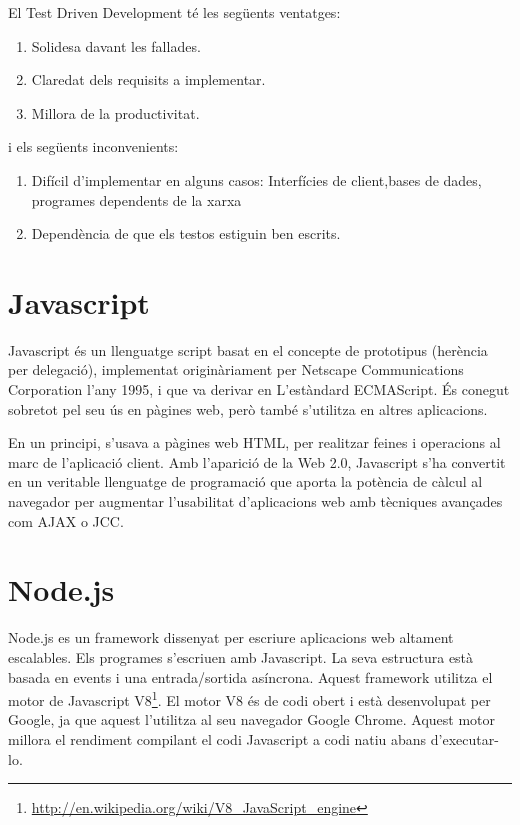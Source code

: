 El Test Driven Development té les següents ventatges: 

\begin{enumerate}
    \item{Solidesa davant les fallades.}
    \item{Claredat dels requisits a implementar.}
    \item{Millora de la productivitat.}
\end{enumerate}

i els següents inconvenients: 

\begin{enumerate}
    \item{Difícil d'implementar en alguns casos: Interfícies de client,bases de dades, programes dependents de la xarxa }
    \item{Dependència de que els testos estiguin ben escrits. }
    
\end{enumerate}



\section{Javascript}

Javascript és un llenguatge script basat en el concepte de prototipus (herència per delegació), implementat originàriament per Netscape Communications Corporation l'any 1995, i que va derivar en L'estàndard ECMAScript. És conegut sobretot pel seu ús en pàgines web, però també s'utilitza en altres aplicacions.

En un principi, s'usava a pàgines web HTML, per realitzar feines i operacions al marc de l'aplicació client. Amb l'aparició de la Web 2.0, Javascript s'ha convertit en un veritable llenguatge de programació que aporta la potència de càlcul al navegador per augmentar l'usabilitat d'aplicacions web amb tècniques avançades com AJAX o JCC.


\section{Node.js}

Node.js es un framework dissenyat per escriure aplicacions web altament escalables. Els programes s'escriuen amb Javascript. La seva estructura està basada en events i una entrada/sortida asíncrona. Aquest framework utilitza el motor de Javascript V8\footnote{\url{http://en.wikipedia.org/wiki/V8_JavaScript_engine}}. El motor V8 és de codi obert i està desenvolupat per Google, ja que aquest l'utilitza al seu navegador Google Chrome. Aquest motor millora el rendiment compilant el codi Javascript a codi natiu abans d'executar-lo.

